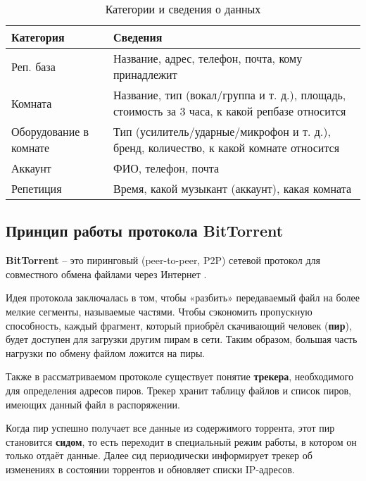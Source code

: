 \begin{table}[!h]
	\captionsetup{justification=centering}
	\caption{\label{tab:data} Категории и сведения о данных}
	\begin{center}
		\begin{tabular}{|p{}|p{}|}
			\hline
			\textbf{Категория} & \textbf{Сведения}\\
			\hline
			Реп. база & Название, адрес, телефон, почта, кому принадлежит \\
			\hline
			Комната & Название, тип (вокал/группа и т. д.), площадь, стоимость за 3 часа, к какой репбазе относится \\
			\hline
			Оборудование в комнате & Тип (усилитель/ударные/микрофон и т. д.), бренд, количество, к какой комнате относится \\
			\hline
			Аккаунт & ФИО, телефон, почта \\
			\hline
			Репетиция & Время, какой музыкант (аккаунт), какая комната \\
			\hline
		\end{tabular}
	\end{center}
\end{table}

\newpage

\subsection{Принцип работы протокола BitTorrent}

\textbf{BitTorrent} -- это пиринговый (peer-to-peer, P2P) сетевой протокол для совместного обмена файлами через Интернет \cite{bittor_basics}.

Идея протокола заключалась в том, чтобы «разбить» передаваемый файл на более мелкие сегменты, называемые частями. Чтобы сэкономить пропускную способность, каждый фрагмент, который приобрёл скачивающий человек (\textbf{пир}), будет доступен для загрузки другим пирам в сети. Таким образом, большая часть нагрузки по обмену файлом ложится на пиры.

Также в рассматриваемом протоколе существует понятие \textbf{трекера}, необходимого для определения адресов пиров. Трекер хранит таблицу файлов и список пиров, имеющих данный файл в распоряжении.

Когда пир успешно получает все данные из содержимого торрента, этот пир становится \textbf{сидом}, то есть переходит в специальный режим работы, в котором он только отдаёт данные. Далее сид периодически информирует трекер об изменениях в состоянии торрентов и обновляет списки IP-адресов.

